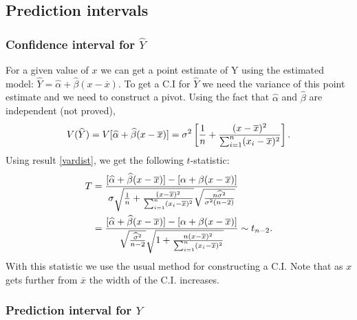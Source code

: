 \documentclass[10pt, two column]{article}
\begin{document}
\subsection{Prediction intervals}

\subsubsection{Confidence interval for $\widehat{Y}$} \label{CIYhat}

For a given value of $x$ we can get a point estimate of Y using the estimated model: $\widehat{Y} = \widehat{\alpha} + \widehat{\beta}(x - \overline{x})$. To get a C.I for $\widehat{Y}$ we need the variance of this point estimate and we need to construct a pivot. Using the fact that $\widehat{\alpha}$ and $\widehat{\beta}$ are independent (not proved), \vspace{-6pt}
\[
V(\widehat{Y}) = V[\widehat{\alpha} + \widehat{\beta}(x - \overline{x})] = \sigma^{2}\left[ \frac{1}{n} + \frac{(x - \overline{x})^{2}}{\sum_{i=1}^{n} (x_{i} - \overline{x})^{2}} \right].
\vspace{-6pt} \]
Using result \eqref{vardist}, we get the following $t$-statistic: \vspace{-6pt}
\begin{align*}
T &= \frac{[\widehat{\alpha} + \widehat{\beta}(x - \overline{x})] - [\alpha + \beta(x - \overline{x})]}{ \sigma \sqrt{ \frac{1}{n} + \frac{(x - \overline{x})^{2}}{\sum_{i=1}^{n} (x_{i} - \overline{x})^{2}} } \sqrt{\frac{n\widehat{\sigma}^{2}}{\sigma^{2}(n-2)}} } \\
&= \frac{[\widehat{\alpha} + \widehat{\beta}(x - \overline{x})] - [\alpha + \beta(x - \overline{x})]}{ \sqrt{\frac{\widehat{\sigma}^{2}}{n-2}} \sqrt{ 1 + \frac{n(x - \overline{x})^{2}}{\sum_{i=1}^{n} (x_{i} - \overline{x})^{2}} }  } \sim t_{n-2}. \vspace{-6pt}
\end{align*}
With this statistic we use the usual method for constructing a C.I. Note that as $x$ gets further from $\overline{x}$ the width of the C.I. increases. 

\subsubsection{Prediction interval for $Y$}
\end{document}
